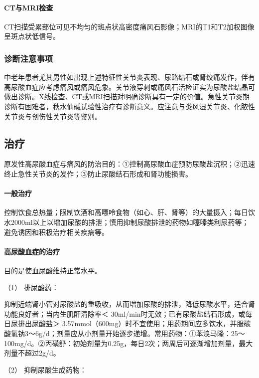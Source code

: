 \paragraph{CT与MRI检查}

CT扫描受累部位可见不均匀的斑点状高密度痛风石影像；MRI的T1和T2加权图像呈斑点状低信号。

\subsubsection{诊断注意事项}

中老年患者尤其男性如出现上述特征性关节炎表现、尿路结石或肾绞痛发作，伴有高尿酸血症应考虑痛风或痛风危象。关节液穿刺或痛风石活检证实为尿酸盐结晶可做出诊断。X线检查、CT或MRI扫描对明确诊断具有一定的价值。急性关节炎期诊断有困难者，秋水仙碱试验性治疗有诊断意义。应注意与类风湿关节炎、化脓性关节炎与创伤性关节炎等鉴别。

\subsection{治疗}

原发性高尿酸血症与痛风的防治目的：①控制高尿酸血症预防尿酸盐沉积；②迅速终止急性关节炎的发作；③防止尿酸结石形成和肾功能损害。

\paragraph{一般治疗}

控制饮食总热量；限制饮酒和高嘌呤食物（如心、肝、肾等）的大量摄入；每日饮水2000ml以上以增加尿酸的排泄；慎用抑制尿酸排泄的药物如噻嗪类利尿药等；避免诱因和积极治疗相关疾病等。

\paragraph{高尿酸血症的治疗}

目的是使血尿酸维持正常水平。

\hypertarget{text00125.htmlux5cux23CHP4-15-3-2-1}{}
（1） 排尿酸药：

抑制近端肾小管对尿酸盐的重吸收，从而增加尿酸的排泄，降低尿酸水平，适合肾功能良好者；当内生肌酐清除率＜
30ml/min时无效；已有尿酸盐结石形成，或每日尿排出尿酸盐＞
3.57mmol（600mg）时不宜使用；用药期间应多饮水，并服碳酸氢钠3～6g/d；剂量应从小剂量开始逐步递增。常用药物：①苯溴马隆：25～100mg/d。②丙磺舒：初始剂量为0.25g，每日2次；两周后可逐渐增加剂量，最大剂量不超过2g/d。

\hypertarget{text00125.htmlux5cux23CHP4-15-3-2-2}{}
（2） 抑制尿酸生成药物：

